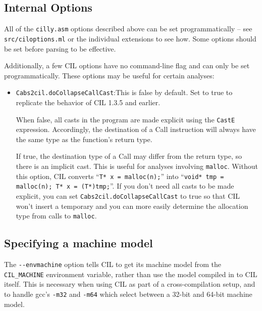 \documentclass[letterpaper]{article}
\def\t#1{{\tt #1}}
\begin{document}
\subsection{Internal Options}
\label{sec-cilly-internal-options}

All of the \t{cilly.asm} options described above can be set
programmatically -- see \t{src/ciloptions.ml} or the individual
extensions to see how.  Some options should be set before parsing to
be effective.  

Additionally, a few CIL options have no command-line flag and can only
be set programmatically.  These options may be useful for certain
analyses:

\begin{itemize}
\item \t{Cabs2cil.doCollapseCallCast}:This is false by default.  Set
to true to replicate the behavior of CIL 1.3.5 and earlier.

When false, all casts in the program are made explicit using the
\t{CastE} expression. Accordingly, the destination of a Call
instruction will always have the same type as the function's return
type.

If true, the destination type of a Call may differ from the return type, so
there is an implicit cast.  This is useful for analyses involving
\t{malloc}.  Without this option, CIL converts ``\t{T* x = malloc(n);}''
into ``\t{void* tmp = malloc(n); T* x = (T*)tmp;}''.  If you don't
need all casts to be made explicit, you can set
\t{Cabs2cil.doCollapseCallCast} to true so that CIL won't insert a
temporary and you can more easily determine the allocation type from
calls to \t{malloc}.


\end{itemize}

\subsection{Specifying a machine model}
\label{sec-cilmachine}

The \t{-{}-envmachine} option tells CIL to get its machine model from
the \t{CIL\_MACHINE} environment variable, rather than use the model
compiled in to CIL itself. This is necessary when using CIL as part of
a cross-compilation setup, and to handle gcc's \t{-m32} and \t{-m64}
which select between a 32-bit and 64-bit machine model.
\end{document}
